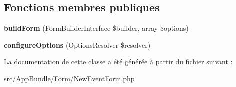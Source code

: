 \subsection*{Fonctions membres publiques}
\begin{DoxyCompactItemize}
\item 
\mbox{\label{classAppBundle_1_1Form_1_1NewEventForm_a8cf71eb9f00d33293aafd4efa44982f5}} 
{\bfseries build\+Form} (Form\+Builder\+Interface \$builder, array \$options)
\item 
\mbox{\label{classAppBundle_1_1Form_1_1NewEventForm_a862390c98e7a2f1fe7bc057329a83c46}} 
{\bfseries configure\+Options} (Options\+Resolver \$resolver)
\end{DoxyCompactItemize}


La documentation de cette classe a été générée à partir du fichier suivant \+:\begin{DoxyCompactItemize}
\item 
src/\+App\+Bundle/\+Form/New\+Event\+Form.\+php\end{DoxyCompactItemize}
